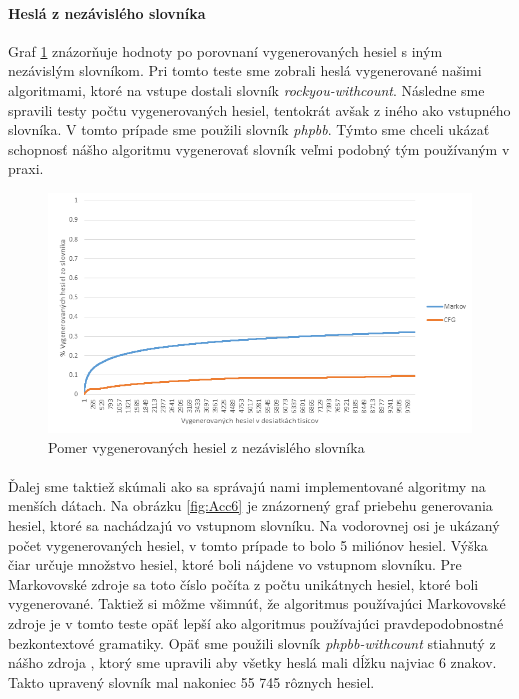\paragraph{Heslá z nezávislého slovníka}
Graf \ref{fig:otherDictAcc} znázorňuje hodnoty po porovnaní vygenerovaných hesiel s iným nezávislým slovníkom. Pri tomto teste sme zobrali heslá vygenerované našimi algoritmami, ktoré na vstupe dostali slovník \emph{rockyou-withcount}. Následne sme spravili testy počtu vygenerovaných hesiel, tentokrát avšak z iného ako vstupného slovníka. V tomto prípade sme použili slovník \emph{phpbb}. Týmto sme chceli ukázať schopnosť nášho algoritmu vygenerovať slovník veľmi podobný tým používaným v praxi.

\begin{figure}[ht]
    \centering
    \includegraphics[width=1\textwidth]{otherDictAcc}
    \caption{Pomer vygenerovaných hesiel z nezávislého slovníka}
    \label{fig:otherDictAcc}
\end{figure}

\paragraph{}
Ďalej sme taktiež skúmali ako sa správajú nami implementované algoritmy na menších dátach. Na obrázku \ref{fig:Acc6} je znázornený graf priebehu generovania hesiel, ktoré sa nachádzajú vo vstupnom slovníku. Na vodorovnej osi je ukázaný počet vygenerovaných hesiel, v tomto prípade to bolo 5 miliónov hesiel. Výška čiar určuje množstvo hesiel, ktoré boli nájdene vo vstupnom slovníku. Pre Markovovské zdroje sa toto číslo počíta z počtu unikátnych hesiel, ktoré boli vygenerované. Taktiež si môžme všimnúť, že algoritmus používajúci Markovovské zdroje je v tomto teste opäť lepší ako algoritmus používajúci pravdepodobnostné bezkontextové gramatiky. Opäť sme použili slovník \emph{phpbb-withcount} stiahnutý z nášho zdroja \cite{dictionaries}, ktorý sme upravili aby všetky heslá mali dĺžku najviac 6 znakov. Takto upravený slovník mal nakoniec 55 745 rôznych hesiel.

